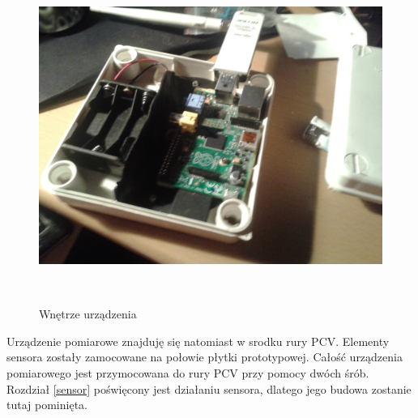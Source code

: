 \documentclass[11pt,a4paper, twoside]{article}
\begin{document}
\begin{figure}[H]
\begin{center}
\includegraphics[scale=0.08]{./img/insides1.jpg}
\caption{Wnętrze urządzenia}
$\label{skrzynka-in}$
\end{center}
\end{figure}
Urządzenie pomiarowe znajduję się natomiast w srodku rury PCV. Elementy sensora zostały zamocowane na połowie płytki prototypowej. Całość urządzenia pomiarowego jest przymocowana do rury PCV przy pomocy dwóch śrób. Rozdział \ref{sensor} poświęcony jest działaniu sensora, dlatego jego budowa zostanie tutaj pominięta.
\end{document}
